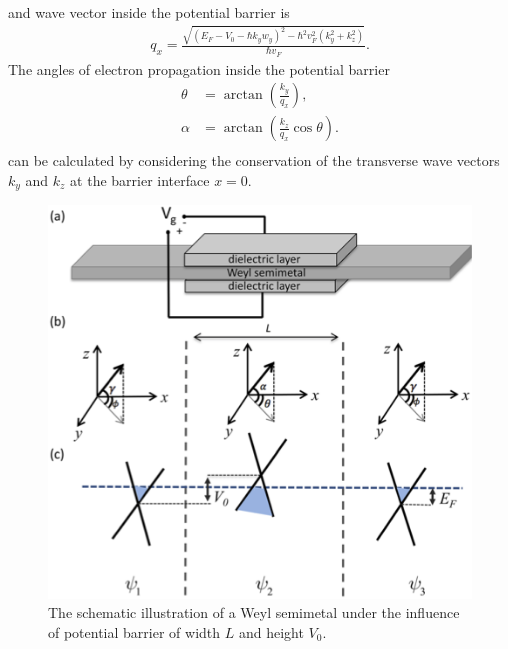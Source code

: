     and wave vector inside the potential barrier is
    \begin{align} \label{2eq:inside wavevector}
        q_x = \frac{\sqrt{(E_F-V_0-\hbar k_y w_y)^2 - \hbar^2 v_F^2 (k_y^2 + k_z^2)}}{\hbar v_F}.
    \end{align}
    The angles of electron propagation inside the potential barrier 
    \begin{equation} \label{2eq:angles}
        \begin{aligned}
            \theta &= \arctan{\left(\frac{k_y}{q_x}\right)},\\
            \alpha &= \arctan{\left(\frac{k_z}{q_x} \cos{\theta}\right)}.\\
        \end{aligned}
    \end{equation}
    can be calculated by considering the conservation of the transverse wave vectors $k_y$ and $k_z$ at the barrier interface $x = 0$. 
    \begin{figure}[H] 
        \centering
        \includegraphics[width = 0.6\linewidth]{fig/Chap 2/2transistor.png}
        \caption{The schematic illustration of a Weyl semimetal under the influence of potential barrier of width $L$ and height $V_0$.}
        \label{2fig:weyl transistor}
    \end{figure}


